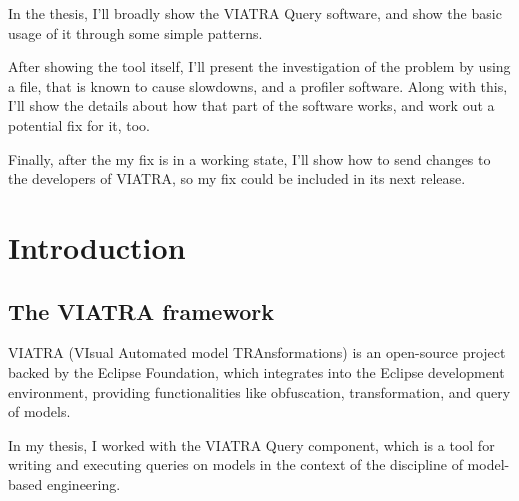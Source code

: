 \documentclass[11pt,a4paper,oneside]{report}
\begin{document}
In the thesis, I'll broadly show the VIATRA Query software, and show the
basic usage of it through some simple patterns.

After showing the tool itself, I'll present the investigation of the problem by
using a file, that is known to cause slowdowns, and a profiler software. Along
with this, I'll show the details about how that part of the software works, and
work out a potential fix for it, too.

Finally, after the my fix is in a working state, I'll show how to send changes
to the developers of VIATRA, so my fix could be included in its next release.
\vfill


\cleardoublepage
\selectthesislanguage
{}
\setcounter{romanPage}{\value{page}}


\chapter{Introduction}

\section{The VIATRA framework}
VIATRA (VIsual Automated model TRAnsformations) is an open-source project backed
by the Eclipse Foundation, which integrates into the Eclipse development
environment, providing functionalities like obfuscation, transformation, and
query of models.

In my thesis, I worked with the VIATRA Query component, which is a tool for
writing and executing queries on models in the context of the discipline of
model-based engineering.
\end{document}
